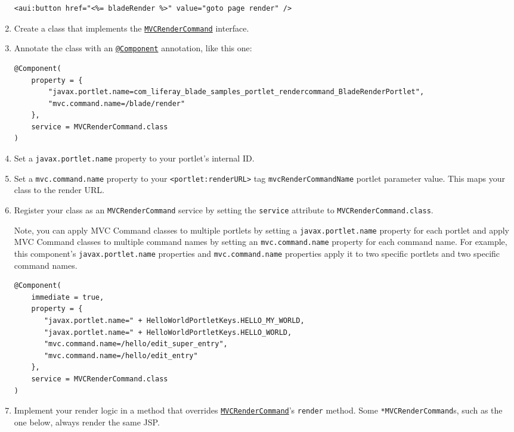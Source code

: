 \begin{enumerate}
\begin{verbatim}
<aui:button href="<%= bladeRender %>" value="goto page render" />
\end{verbatim}
\item
  Create a class that implements the
  \href{https://docs.liferay.com/dxp/portal/7.2-latest/javadocs/portal-kernel/com/liferay/portal/kernel/portlet/bridges/mvc/MVCRenderCommand.html}{\texttt{MVCRenderCommand}}
  interface.
\item
  Annotate the class with an
  \href{https://docs.osgi.org/javadoc/osgi.cmpn/7.0.0/org/osgi/service/component/annotations/Component.html}{\texttt{@Component}}
  annotation, like this one:

\begin{verbatim}
@Component(
    property = {
        "javax.portlet.name=com_liferay_blade_samples_portlet_rendercommand_BladeRenderPortlet",
        "mvc.command.name=/blade/render"
    },
    service = MVCRenderCommand.class
)
\end{verbatim}
\item
  Set a \texttt{javax.portlet.name} property to your portlet's internal
  ID.
\item
  Set a \texttt{mvc.command.name} property to your
  \texttt{\textless{}portlet:renderURL\textgreater{}} tag
  \texttt{mvcRenderCommandName} portlet parameter value. This maps your
  class to the render URL.
\item
  Register your class as an \texttt{MVCRenderCommand} service by setting
  the \texttt{service} attribute to \texttt{MVCRenderCommand.class}.

  Note, you can apply MVC Command classes to multiple portlets by
  setting a \texttt{javax.portlet.name} property for each portlet and
  apply MVC Command classes to multiple command names by setting an
  \texttt{mvc.command.name} property for each command name. For example,
  this component's \texttt{javax.portlet.name} properties and
  \texttt{mvc.command.name} properties apply it to two specific portlets
  and two specific command names.

\begin{verbatim}
@Component(
    immediate = true,
    property = {
       "javax.portlet.name=" + HelloWorldPortletKeys.HELLO_MY_WORLD,
       "javax.portlet.name=" + HelloWorldPortletKeys.HELLO_WORLD,
       "mvc.command.name=/hello/edit_super_entry",
       "mvc.command.name=/hello/edit_entry"
    },
    service = MVCRenderCommand.class
)
\end{verbatim}
\item
  Implement your render logic in a method that overrides
  \href{https://docs.liferay.com/dxp/portal/7.2-latest/javadocs/portal-kernel/com/liferay/portal/kernel/portlet/bridges/mvc/MVCRenderCommand.html}{\texttt{MVCRenderCommand}}'s
  \texttt{render} method. Some \texttt{*MVCRenderCommand}s, such as the
  one below, always render the same JSP.


\end{enumerate}
